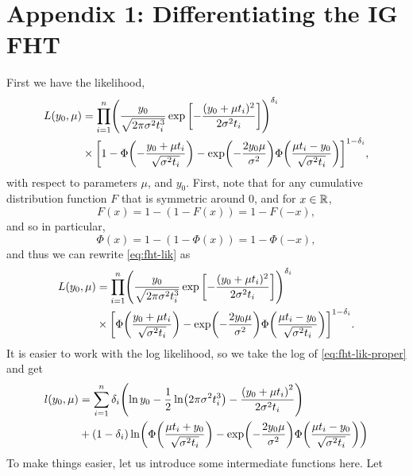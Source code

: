 \chapter{Appendix 1: Differentiating the IG FHT}\label{appendix}
First we have the likelihood,
\begin{align}\label{eq:fht-lik}
\begin{split}
L(y_0, \mu)&=\prod_{i=1}^n\p*{\frac{y_0}{\sqrt{2\pi\sigma^2\ti^3}}\exp\left[-\frac{(y_0+\mu \ti)^2}{2\sigma^2\ti}\right]}^{\di}\\
&\times\sqb*{1-\Phi\p*{-\frac{y_0+\mu \ti}{\sqrt{\sigma^2\ti}}}-\exp\p*{-\frac{2y_0\mu}{\sigma^2}}\Phi\p*{\frac{\mu \ti-y_0}{\sqrt{\sigma^2\ti}}}}^{1-\di},
\end{split}
\end{align}
with respect to parameters $\mu$, and $y_0$. First, note that for any cumulative distribution function $F$ that is symmetric around 0, and for $x\in\mathbb{R}$,
\begin{equation}
    F(x)=1-(1-F(x))=1-F(-x),
\end{equation}
and so in particular,
\begin{equation}
    \Phi(x)=1-(1-\Phi(x))=1-\Phi(-x),
\end{equation}
and thus we can rewrite \eqref{eq:fht-lik} as
\begin{align}\label{eq:fht-lik-proper}
\begin{split}
L(y_0, \mu)&=\prod_{i=1}^n\p*{\frac{y_0}{\sqrt{2\pi\sigma^2\ti^3}}\exp\left[-\frac{(y_0+\mu \ti)^2}{2\sigma^2\ti}\right]}^{\di}\\
&\times\sqb*{\Phi\p*{\frac{y_0+\mu \ti}{\sqrt{\sigma^2\ti}}}-\exp\p*{-\frac{2y_0\mu}{\sigma^2}}\Phi\p*{\frac{\mu \ti-y_0}{\sqrt{\sigma^2\ti}}}}^{1-\di}.
\end{split}
\end{align}
It is easier to work with the log likelihood, so we take the log of \eqref{eq:fht-lik-proper} and get
\begin{align}\label{eq:fht-loglik}
\begin{split}
    l(y_0, \mu)&=\sum_{i=1}^n\di\p*{\ln y_0-\frac{1}{2}\ln\p*{2\pi\sigma^2\ti^3}-\frac{\p*{y_0+\mu\ti}^2}{2\sigma^2\ti}} \\
    &+
    (1-\di)\ln\p*{\Phi\p*{\frac{\mu\ti+y_0}{\sqrt{\sigma^2\ti}}}-\exp\p*{-\frac{2y_0\mu}{\sigma^2}}\Phi\p*{\frac{\mu\ti-y_0}{\sqrt{\sigma^2\ti}}}}
\end{split}
\end{align}
To make things easier, let us introduce some intermediate functions here. Let
